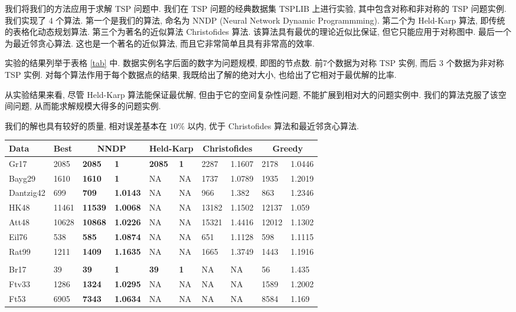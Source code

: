 \documentclass{article}
\begin{document}
我们将我们的方法应用于求解 TSP 问题中.
我们在 TSP 问题的经典数据集 TSPLIB 上进行实验, 其中包含对称和非对称的 TSP 问题实例. 
我们实现了 4 个算法. 
第一个是我们的算法, 命名为 NNDP (Neural Network Dynamic Programmming).
第二个为 Held-Karp 算法, 即传统的表格化动态规划算法.
第三个为著名的近似算法 Christofides 算法. 
该算法具有最优的理论近似比保证, 但它只能应用于对称图中.
最后一个为最近邻贪心算法. 
这也是一个著名的近似算法, 而且它非常简单且具有非常高的效率.

实验的结果列举于表格 \ref{tab} 中. 
数据实例名字后面的数字为问题规模, 即图的节点数.
前7个数据为对称 TSP 实例, 而后 3 个数据为非对称 TSP 实例.
对每个算法作用于每个数据点的结果, 我既给出了解的绝对大小, 也给出了它相对于最优解的比率.

从实验结果来看, 尽管 Held-Karp 算法能保证最优解, 但由于它的空间复杂性问题, 不能扩展到相对大的问题实例中. 
我们的算法克服了该空间问题, 从而能求解规模大得多的问题实例.

我们的解也具有较好的质量, 相对误差基本在 $10\%$ 以内, 优于 Christofides 算法和最近邻贪心算法. 

\begin{table*}[htbp] %
	\centering
	\caption{Experimental results in TSPLIB}
	\label{tab}
	\begin{tabular}{|l|l|l|l|l|l|l|l|l|l|}
		\hline
		\textbf{Data} & \textbf{Best} & \multicolumn{2}{|c|}{\textbf{NNDP}} & \multicolumn{2}{|c|}{\textbf{Held-Karp}} & \multicolumn{2}{|c|}{\textbf{Christofides}} &  \multicolumn{2}{|c|}{\textbf{Greedy}}\\
		\hline
		Gr17 & 2085 & \textbf{2085} & \textbf{1} & \textbf{2085} & \textbf{1} & 2287 & 1.1607 & 2178 & 1.0446\\
		\hline
		Bayg29 & 1610 & \textbf{1610} & \textbf{1} & NA & NA & 1737 & 1.0789 & 1935 & 1.2019\\
		\hline
		Dantzig42 & 699 & \textbf{709} & \textbf{1.0143} & NA & NA & 966 & 1.382 & 863 & 1.2346\\
		\hline
		HK48 & 11461 & \textbf{11539} & \textbf{1.0068} & NA & NA & 13182 & 1.1502 & 12137 & 1.059\\
		\hline
		Att48 & 10628 & \textbf{10868} & \textbf{1.0226} & NA & NA & 15321 & 1.4416 & 12012 & 1.1302\\
		\hline
		Eil76 & 538 & \textbf{585} & \textbf{1.0874} & NA & NA & 651 & 1.1128 & 598 & 1.1115\\
		\hline
		Rat99 & 1211 & \textbf{1409} & \textbf{1.1635} & NA & NA & 1665 & 1.3749 & 1443 & 1.1916\\
		\hline
		\multicolumn{10}{|c|}{}\\
		\hline
		Br17 & 39 & \textbf{39} & \textbf{1} & \textbf{39} & \textbf{1} & NA & NA & 56 & 1.435\\
		\hline
		Ftv33 & 1286 & \textbf{1324} & \textbf{1.0295} & NA & NA & NA & NA & 1589 & 1.2002\\
		\hline
		Ft53 & 6905 & \textbf{7343} & \textbf{1.0634} & NA & NA & NA & NA & 8584 & 1.169\\
		\hline
	\end{tabular}
\end{table*}
\end{document}
